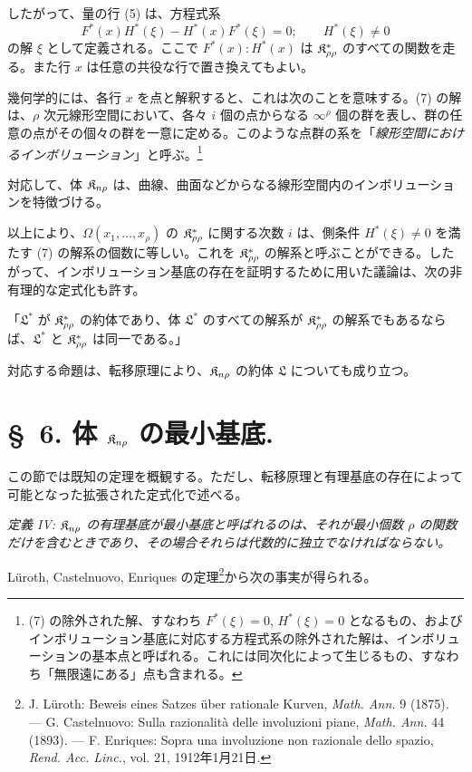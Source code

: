 \documentclass[11pt]{jlreq}
\begin{document}
したがって、量の行 (5) は、方程式系
\[
  F^*(x)H^*(\xi)-H^*(x)F^*(\xi)=0;
  \qquad H^*(\xi)\ne0
\]
の解 $\xi$ として定義される。ここで $F^*(x):H^*(x)$ は $\mathfrak{K}^*_{\rho\rho}$ のすべての関数を走る。また行 $x$ は任意の共役な行で置き換えてもよい。

幾何学的には、各行 $x$ を点と解釈すると、これは次のことを意味する。(7) の解は、$\rho$ 次元線形空間において、各々 $i$ 個の点からなる $\infty^\rho$ 個の群を表し、群の任意の点がその個々の群を一意に定める。このような点群の系を「\emph{線形空間におけるインボリューション}」と呼ぶ。\footnote{(7) の除外された解、すなわち $F^*(\xi)=0$, $H^*(\xi)=0$ となるもの、およびインボリューション基底に対応する方程式系の除外された解は、インボリューションの基本点と呼ばれる。これには同次化によって生じるもの、すなわち「無限遠にある」点も含まれる。}

対応して、体 $\mathfrak{K}_{n\rho}$ は、曲線、曲面などからなる線形空間内のインボリューションを特徴づける。

以上により、$\Omega(x_1,\ldots,x_\rho)$ の $\mathfrak{K}^*_{\rho\rho}$ に関する次数 $i$ は、側条件 $H^*(\xi)\ne0$ を満たす (7) の解系の個数に等しい。これを $\mathfrak{K}^*_{\rho\rho}$ の解系と呼ぶことができる。したがって、インボリューション基底の存在を証明するために用いた議論は、次の非有理的な定式化も許す。

「$\mathfrak{L}^*$ が $\mathfrak{K}^*_{\rho\rho}$ の約体であり、体 $\mathfrak{L}^*$ のすべての解系が $\mathfrak{K}^*_{\rho\rho}$ の解系でもあるならば、$\mathfrak{L}^*$ と $\mathfrak{K}^*_{\rho\rho}$ は同一である。」

対応する命題は、転移原理により、$\mathfrak{K}_{n\rho}$ の約体 $\mathfrak{L}$ についても成り立つ。

\section*{\S\ 6. 体 $\mathfrak{K}_{n\rho}$ の最小基底.}

この節では既知の定理を概観する。ただし、転移原理と有理基底の存在によって可能となった拡張された定式化で述べる。

\emph{定義 IV: $\mathfrak{K}_{n\rho}$ の有理基底が最小基底と呼ばれるのは、それが最小個数 $\rho$ の関数だけを含むときであり、その場合それらは代数的に独立でなければならない。}

Lüroth, Castelnuovo, Enriques の定理\footnote{J. Lüroth: Beweis eines Satzes über rationale Kurven, \emph{Math. Ann.} 9 (1875). --- G. Castelnuovo: Sulla razionalità delle involuzioni piane, \emph{Math. Ann.} 44 (1893). --- F. Enriques: Sopra una involuzione non razionale dello spazio, \emph{Rend. Acc. Linc.}, vol. 21, 1912年1月21日.}から次の事実が得られる。
\end{document}
